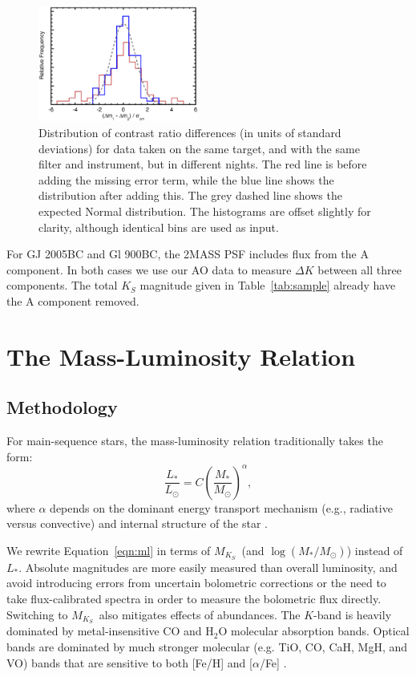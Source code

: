 \documentclass[twocolumn]{aastex62}
\newcommand{\mks}{$M_{K_S}$}
\begin{document}
\begin{figure}[htb]
\begin{center}
\includegraphics[width=0.47\textwidth]{errors.eps}
\caption{Distribution of contrast ratio differences (in units of standard deviations) for data taken on the same target, and with the same filter and instrument, but in different nights. The red line is before adding the missing error term, while the blue line shows the distribution after adding this. The grey dashed line shows the expected Normal distribution. The histograms are offset slightly for clarity, although identical bins are used as input.}
\label{fig:magnitudes}
\end{center}
\end{figure}

For GJ 2005BC and Gl 900BC, the 2MASS PSF includes flux from the A component. In both cases we use our AO data to measure $\Delta K$ between all three components. The total $K_S$ magnitude given in Table~\ref{tab:sample} already have the A component removed. 

\section{The Mass-Luminosity Relation}\label{sec:relation}

\subsection{Methodology}

For main-sequence stars, the mass-luminosity relation traditionally takes the form:
\begin{equation}\label{eqn:ml}
\frac{L_*}{L_\odot} = C \left(\frac{M_*}{M_\odot}\right)^\alpha,
\end{equation}
where $\alpha$ depends on the dominant energy transport mechanism (e.g., radiative versus convective) and internal structure of the star \citep{2004sipp.book.....H}. 

We rewrite Equation~\ref{eqn:ml} in terms of \mks\ (and $\log(M_*/M_\odot)$) instead of $L_*$. Absolute magnitudes are more easily measured than overall luminosity, and avoid introducing errors from uncertain bolometric corrections or the need to take flux-calibrated spectra in order to measure the bolometric flux directly. Switching to \mks\ also mitigates effects of abundances. The $K$-band is heavily dominated by metal-insensitive CO and H$_2$O molecular absorption bands. Optical bands are dominated by much stronger molecular (e.g. TiO, CO, CaH, MgH, and VO) bands that are sensitive to both [Fe/H] and [$\alpha$/Fe] \citep[Figure~\ref{fig:metal}, also see][]{Woolf:2006uq,Lepine:2007fk,Mann2013a}. 
\end{document}
